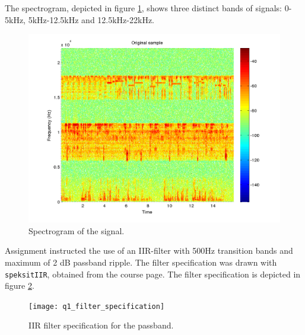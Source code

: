 The spectrogram, depicted in figure \ref{fig:q1_spectrogram}, shows
three distinct bands of signals: 0-5kHz, 5kHz-12.5kHz and 12.5kHz-22kHz.

\begin{figure}
  \begin{center}
    \hspace*{-1in}
    \includegraphics[width=180mm]{q1_spectrogram}
    \caption{Spectrogram of the signal. \label{fig:q1_spectrogram}}
  \end{center}  
\end{figure}

Assignment instructed the use of an IIR-filter with 500Hz transition
bands and maximum of 2 dB passband ripple.  The filter specification was
drawn with {\tt speksitIIR}, obtained from the course page.  The filter
specification is depicted in figure \ref{fig:q1_filter_specification}.

\begin{figure}
  \begin{center}
    \hspace*{-1in}
    \texttt{[image: q1\_filter\_specification]}
    \caption{IIR filter specification for the
      passband. \label{fig:q1_filter_specification}}
  \end{center}  
\end{figure}
